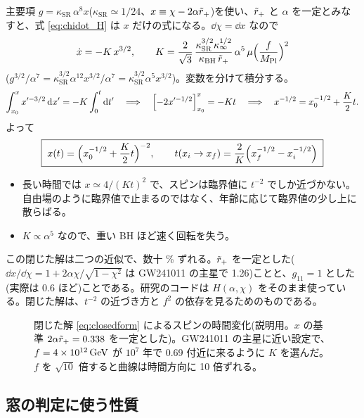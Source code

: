 主要項 $g=\kappa_\mathrm{SR}\,\alpha^8x$($\kappa_\mathrm{SR}\simeq1/24$、$x\equiv\chi-2\alpha\tilde r_+$)を使い、$\tilde r_+$ と $\alpha$ を一定とみなすと、式 \eqref{eq:chidot_H} は $x$ だけの式になる。$\dd\chi=\dd x$ なので
\begin{equation}
\dot x=-K\,x^{3/2},\qquad
K=\frac{2}{\sqrt3}\,\frac{\kappa_\mathrm{SR}^{3/2}\kappa_\infty^{1/2}}{\kappa_\mathrm{BH}\,\tilde r_+}\,\alpha^5\,\mu\Bigl(\frac{f}{M_\mathrm{Pl}}\Bigr)^2
\label{eq:xdot}
\end{equation}
($g^{3/2}/\alpha^7=\kappa_\mathrm{SR}^{3/2}\alpha^{12}x^{3/2}/\alpha^7=\kappa_\mathrm{SR}^{3/2}\alpha^5x^{3/2}$)。変数を分けて積分する。
\begin{equation}
\int_{x_0}^{x}x'^{-3/2}\,\mathrm{d} x'=-K\int_0^t\mathrm{d} t'
\quad\Longrightarrow\quad
\Bigl[-2x'^{-1/2}\Bigr]_{x_0}^{x}=-Kt
\quad\Longrightarrow\quad
x^{-1/2}=x_0^{-1/2}+\frac{K}{2}t.
\end{equation}
よって
\begin{equation}
\boxed{\;x(t)=\Bigl(x_0^{-1/2}+\frac{K}{2}t\Bigr)^{-2},\qquad
t(x_i\to x_f)=\frac{2}{K}\Bigl(x_f^{-1/2}-x_i^{-1/2}\Bigr)\;}
\label{eq:closedform}
\end{equation}
\begin{itemize}
\item 長い時間では $x\simeq4/(Kt)^2$ で、スピンは臨界値に $t^{-2}$ でしか近づかない。自由場のように臨界値で止まるのではなく、年齢に応じて臨界値の少し上に散らばる。
\item $K\propto\alpha^5$ なので、重い BH ほど速く回転を失う。
\end{itemize}
\begin{caution}
この閉じた解は二つの近似で、数十 \% ずれる。$\tilde r_+$ を一定とした($\dd x/\dd\chi=1+2\alpha\chi/\sqrt{1-\chi^2}$ は GW241011 の主星で 1.26)ことと、$g_{11}=1$ とした(実際は 0.6 ほど)ことである。研究のコードは $H(\alpha,\chi)$ をそのまま使っている。閉じた解は、$t^{-2}$ の近づき方と $f^2$ の依存を見るためのものである。
\end{caution}

\begin{figure}[H]
\centering

\caption{閉じた解 \eqref{eq:closedform} によるスピンの時間変化(説明用。$x$ の基準 $2\alpha\tilde r_+=0.338$ を一定とした)。GW241011 の主星に近い設定で、$f=4\times10^{12}\,\mathrm{GeV}$ が $10^7$ 年で 0.69 付近に来るように $K$ を選んだ。$f$ を $\sqrt{10}$ 倍すると曲線は時間方向に 10 倍ずれる。}
\label{fig:spindown}
\end{figure}

\subsection{窓の判定に使う性質}

